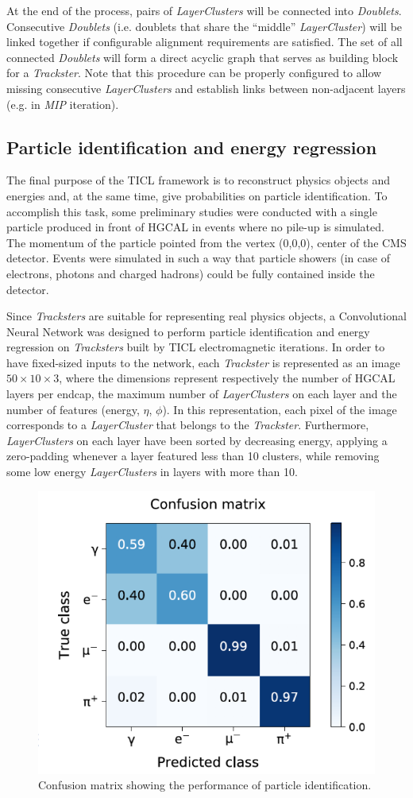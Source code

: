 At the end of the process, pairs of \emph{LayerClusters} will be connected into \emph{Doublets}. Consecutive \emph{Doublets} (i.e. doublets that share the ``middle'' \emph{LayerCluster}) will be linked together if configurable alignment requirements are satisfied. The set of all connected \emph{Doublets} will form a direct acyclic graph that serves as building block for a \emph{Trackster}. Note that this procedure can be properly configured to allow missing consecutive \emph{LayerClusters} and establish links between non-adjacent layers (e.g. in \emph{MIP} iteration). 


\subsection{Particle identification and energy regression}
\label{sec:pid}
The final purpose of the TICL framework is to reconstruct physics objects and energies and, at the same time, give probabilities on particle identification. To accomplish this task, some preliminary studies were conducted with a single particle produced in front of HGCAL in events where no pile-up is simulated. The momentum of the particle pointed from the vertex (0,0,0), center of the CMS detector. Events were simulated in such a way that particle showers (in case of electrons, photons and charged hadrons) could be fully contained inside the detector.

Since \emph{Tracksters} are suitable for representing real physics objects, a Convolutional Neural Network was designed to perform particle identification and energy regression on \emph{Tracksters} built by TICL electromagnetic iterations. In order to have fixed-sized inputs to the network, each \emph{Trackster} is represented as an image $50 \times 10 \times 3$, where the dimensions represent respectively the number of HGCAL layers per endcap, the maximum number of \emph{LayerClusters} on each layer and the number of features (energy, $\eta$, $\phi$). In this representation, each pixel of the image corresponds to a \emph{LayerCluster} that belongs to the \emph{Trackster}. Furthermore, \emph{LayerClusters} on each layer have been sorted by decreasing energy, applying a zero-padding whenever a layer featured less than 10 clusters, while removing some low energy \emph{LayerClusters} in layers with more than 10.

\begin{figure}[t]
    \centering
    \includegraphics[width=.4\textwidth]{chapters/HGCal/figures/chef/pid}
    \caption{\label{fig:pid} Confusion matrix showing the performance of particle identification.}
\end{figure}

